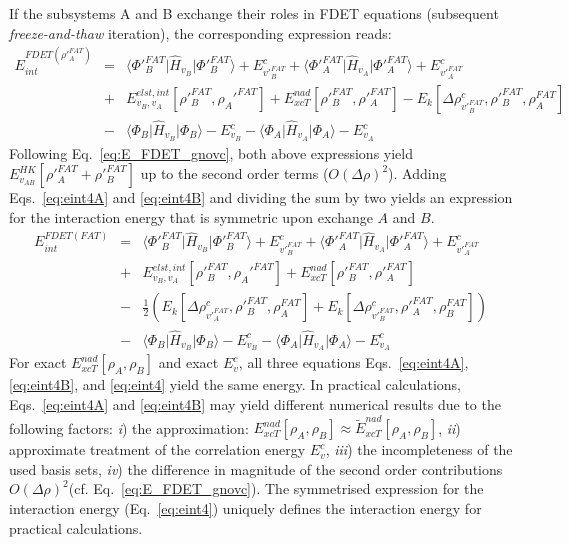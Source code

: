 \documentclass[amsmath,amssymb,preprint,aip,jcp]{revtex4-1}
\newcommand{\nr}[1]{\color{red}#1\color{black}}
\begin{document}
If the subsystems A and B exchange their roles in FDET equations (subsequent \textit{freeze-and-thaw} iteration), the corresponding 
expression reads:
 \begin{eqnarray}
E_{int}^{FDET(\rho'^{FAT}_A)} 
&=&  \langle\Phi'^{FAT}_{B}\vert \hat{H}_{v_B}\vert \Phi'^{FAT}_{B}\rangle + E^{c}_{v'^{FAT}_B} + \langle\Phi'^{FAT}_{A}\vert \hat{H}_{v_A}\vert \Phi'^{FAT}_{A}\rangle  + E^{c}_{v'^{FAT}_A} \label{eq:eint4B}\\ \nonumber
&+& E^{elst,int}_{v_B,v_A}[\rho'^{FAT}_B,\rho_A'^{FAT}] + {E}_{xcT}^{nad}[\rho'^{FAT}_B,\rho'^{FAT}_A]-     E_k[\Delta \rho^{c}_{v'^{FAT}_B}, \rho'^{FAT}_B, \rho^{FAT}_A]  \nonumber\\
&-& 
\langle\Phi_{B}\vert \hat{H}_{v_B}\vert \Phi_{B}\rangle - E^{c}_{v_B}
- \langle\Phi_{A}\vert \hat{H}_{v_A}\vert \Phi_{A}\rangle - E^{c}_{v_A}\nonumber
\end{eqnarray}
Following Eq.~\ref{eq:E_FDET_gnovc}, both above expressions yield $E_{v_{AB}}^{HK}[\rho'^{FAT}_A+\rho'^{FAT}_B]$ up to the second order terms ($O(\Delta\rho)^2$). 
Adding Eqs.~\ref{eq:eint4A} and \ref{eq:eint4B}  and dividing the sum by two yields an expression for the interaction energy that is symmetric upon exchange $A$ and $B$.
\begin{eqnarray}
E_{int}^{FDET(FAT)} 
&=&  \langle\Phi'^{FAT}_{B}\vert \hat{H}_{v_B}\vert \Phi'^{FAT}_{B}\rangle + E^{c}_{v'^{FAT}_B} + \langle\Phi'^{FAT}_{A}\vert \hat{H}_{v_A}\vert \Phi'^{FAT}_{A}\rangle  + E^{c}_{v'^{FAT}_A} \label{eq:eint4}\\ \nonumber
&+& E^{elst,int}_{v_B,v_A}[\rho'^{FAT}_B,\rho_A'^{FAT}] + {E}_{xcT}^{nad}[\rho'^{FAT}_B,\rho'^{FAT}_A] \nonumber \\
&-&    \frac{1}{2}\left(E_k[\Delta \rho^{c}_{v'^{FAT}_A}, \rho'^{FAT}_B, \rho^{FAT}_A]  + E_k[\Delta \rho^{c}_{v'^{FAT}_B}, \rho'^{FAT}_A, \rho^{FAT}_B] \right) \nonumber\\
&-& 
\langle\Phi_{B}\vert \hat{H}_{v_B}\vert \Phi_{B}\rangle - E^{c}_{v_B}
- \langle\Phi_{A}\vert \hat{H}_{v_A}\vert \Phi_{A}\rangle - E^{c}_{v_A}\nonumber
\end{eqnarray}
For exact ${E}_{xcT}^{nad}[\rho_A,\rho_B]$ and exact $E^c_{v}$, all three equations
Eqs.~\ref{eq:eint4A}, \ref{eq:eint4B}, and \ref{eq:eint4} yield the same energy.
In practical calculations, 
Eqs.~\ref{eq:eint4A} and \ref{eq:eint4B} \nr{may } yield different numerical results due to the following factors:
{\it i})  the approximation: ${E}_{xcT}^{nad}[\rho_A,\rho_B]\approx \tilde{E}_{xcT}^{nad}[\rho_A,\rho_B]$, 
{\it ii}) approximate treatment of the correlation energy $E^c_{v}$, {\it iii}) the incompleteness of the used basis sets, {\it iv}) the difference in magnitude of the second order contributions $O(\Delta\rho)^2$(cf. Eq.~\ref{eq:E_FDET_gnovc}).
The symmetrised expression for the interaction energy (Eq.~\ref{eq:eint4}) \nr{uniquely defines } the interaction energy for practical calculations.
\end{document}
